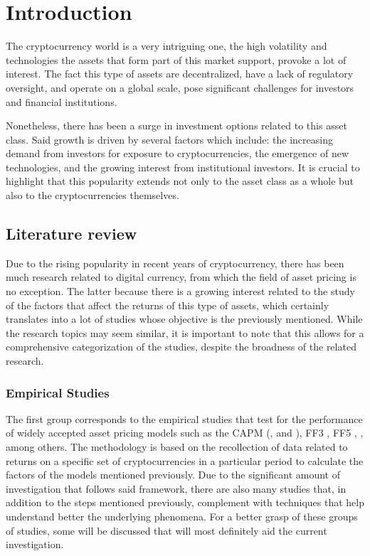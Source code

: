 \chapter{Introduction}
\label{c1} %
The cryptocurrency world is a very intriguing one, the high volatility and technologies the assets that form part of this market support, provoke a lot of interest. The fact this type of assets are decentralized, have a lack of regulatory oversight, and operate on a global scale, pose significant challenges for investors and financial institutions. 

Nonetheless, there has been a surge in investment options related to this asset class. Said growth is driven by several factors which include: the increasing demand from investors for exposure to cryptocurrencies, the emergence of new technologies, and the growing interest from institutional investors. It is crucial to highlight that this popularity extends not only to the asset class as a whole but also to the cryptocurrencies themselves.

\section{Literature review}
Due to the rising popularity in recent years of cryptocurrency, there has been much research related to digital currency, from which the field of asset pricing is no exception. The latter because there is a growing interest related to the study of the factors that affect the returns of this type of assets, which certainly translates into a lot of studies whose objective is the previously mentioned. While the research topics may seem similar, it is important to note that this allows for a comprehensive categorization of the studies, despite the broadness of the related research.

\subsection{Empirical Studies}
The first group corresponds to the empirical studies that test for the performance of widely accepted asset pricing models such as the CAPM (\cite{sharpe1964}, \cite{Lintner1965} and \cite{mossin1966equilibrium}), FF3 \parencite{fama1993}, FF5 \parencite{fama2015}, \parencite{carhart1997}, among others. The methodology is based on the recollection of data related to returns on a specific set of cryptocurrencies in a particular period to calculate the factors of the models mentioned previously. Due to the significant amount of investigation that follows said framework, there are also many studies that, in addition to the steps mentioned previously, complement with techniques that help understand better the underlying phenomena. For a better grasp of these groups of studies, some will be discussed that will most definitely aid the current investigation.

